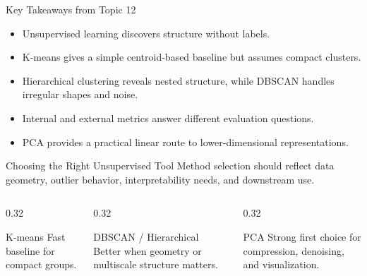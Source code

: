 \documentclass[12pt]{beamer}
\begin{document}
\begin{frame}{Key Takeaways from Topic 12}
  \justifying
  \begin{itemize}
    \item Unsupervised learning discovers structure without labels.
    \item K-means gives a simple centroid-based baseline but assumes compact clusters.
    \item Hierarchical clustering reveals nested structure, while DBSCAN handles irregular shapes and noise.
    \item Internal and external metrics answer different evaluation questions.
    \item PCA provides a practical linear route to lower-dimensional representations.
  \end{itemize}
\end{frame}

\begin{frame}{Choosing the Right Unsupervised Tool}
  \justifying
  Method selection should reflect data geometry, outlier behavior, interpretability needs, and downstream use.

  \begin{columns}[T]
    \begin{column}{0.32\textwidth}
      \begin{examplebox}{K-means}
        Fast baseline for compact groups.
      \end{examplebox}
    \end{column}
    \begin{column}{0.32\textwidth}
      \begin{examplebox}{DBSCAN / Hierarchical}
        Better when geometry or multiscale structure matters.
      \end{examplebox}
    \end{column}
    \begin{column}{0.32\textwidth}
      \begin{examplebox}{PCA}
        Strong first choice for compression, denoising, and visualization.
      \end{examplebox}
    \end{column}
  \end{columns}
\end{frame}
\end{document}
